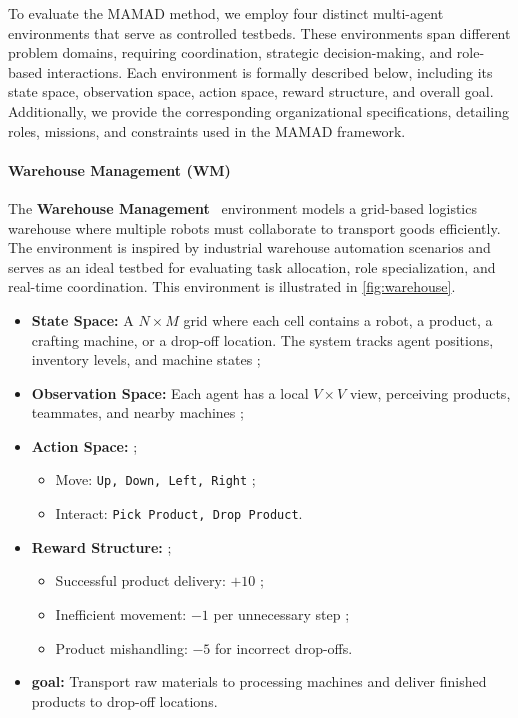 \documentclass[pdflatex,sn-mathphys-num]{sn-jnl}%
\theoremstyle{thmstyleone}%
\theoremstyle{thmstyletwo}%
\theoremstyle{thmstylethree}%
\begin{document}
To evaluate the MAMAD method, we employ four distinct multi-agent environments that serve as controlled testbeds. These environments span different problem domains, requiring coordination, strategic decision-making, and role-based interactions. Each environment is formally described below, including its state space, observation space, action space, reward structure, and overall goal. Additionally, we provide the corresponding organizational specifications, detailing roles, missions, and constraints used in the MAMAD framework.

\paragraph{Warehouse Management (WM)}
The \textbf{Warehouse Management}~\cite{warehouse_management} environment models a grid-based logistics warehouse where multiple robots must collaborate to transport goods efficiently. The environment is inspired by industrial warehouse automation scenarios and serves as an ideal testbed for evaluating task allocation, role specialization, and real-time coordination. This environment is illustrated in \autoref{fig:warehouse}.

\begin{itemize}
    \item \textbf{State Space:} A $N \times M$ grid where each cell contains a robot, a product, a crafting machine, or a drop-off location. The system tracks agent positions, inventory levels, and machine states ;
    \item \textbf{Observation Space:} Each agent has a local $V \times V$ view, perceiving products, teammates, and nearby machines ;
    \item \textbf{Action Space:}  ;
          \begin{itemize}
              \item Move: \texttt{Up, Down, Left, Right} ;
              \item Interact: \texttt{Pick Product, Drop Product}.
          \end{itemize}
    \item \textbf{Reward Structure:} ;
          \begin{itemize}
              \item Successful product delivery: $+10$ ;
              \item Inefficient movement: $-1$ per unnecessary step ;
              \item Product mishandling: $-5$ for incorrect drop-offs.
          \end{itemize}
    \item \textbf{goal:} Transport raw materials to processing machines and deliver finished products to drop-off locations.
\end{itemize}
\end{document}
